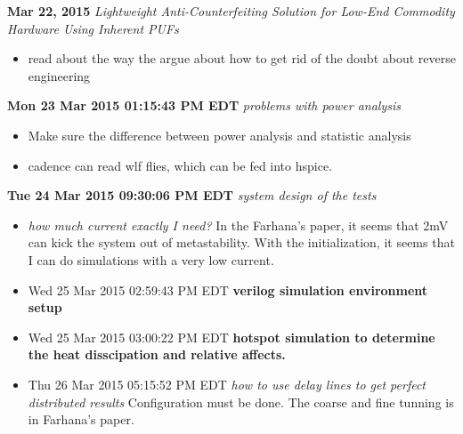 \documentclass[]{article}
\newcommand{\todo}[1]{{\color{red}\textbf{#1}}}
\newcommand{\solved}[1]{{\color{blue}\textit{#1}}}
\begin{document}
\noindent \textbf{Mar 22, 2015}
\textit{Lightweight Anti-Counterfeiting Solution for Low-End Commodity Hardware
Using Inherent PUFs}
\indent     \begin{itemize}
            \item read about the way the argue about how to get rid of the doubt
            about reverse engineering
            \end{itemize}

\noindent \textbf{Mon 23 Mar 2015 01:15:43 PM EDT}
\textit{problems with power analysis}
\indent		\begin{itemize}
                \item Make sure the difference between power analysis and statistic
                analysis
                \item cadence can read wlf flies, which can be fed into hspice.
            \end{itemize}

\noindent \textbf{Tue 24 Mar 2015 09:30:06 PM EDT}
\textit{system design of the tests}
\indent		\begin{itemize}
            \item \solved{how much current exactly I need?} In the Farhana's
            paper, it seems that 2mV can kick the system out of metastability.
            With the initialization, it seems that I can do simulations with a
            very low current.
            \item Wed 25 Mar 2015 02:59:43 PM EDT \todo{verilog simulation
            environment setup}
            \item Wed 25 Mar 2015 03:00:22 PM EDT \todo{hotspot simulation to
            determine the heat disscipation and relative affects.}
            \item Thu 26 Mar 2015 05:15:52 PM EDT \solved{how to use delay lines
            to get perfect distributed results} Configuration must be done. The
            coarse and fine tunning is in Farhana's paper.
            \end{itemize}
\end{document}
